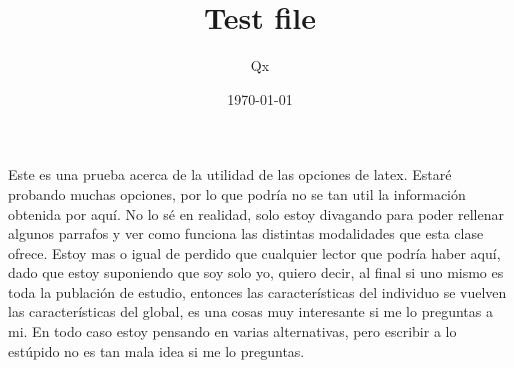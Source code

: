 \documentclass[pagesize=a5paper]{qx-files/qx-notes}
\title{Test file}
\author{Qx}
\date{\today}
\begin{document}
  \maketitle

  Este es una prueba acerca de la utilidad de las opciones de latex. Estaré probando muchas opciones,
  por lo que podría no se tan util la información obtenida por aquí. No lo sé en realidad, solo estoy
  divagando para poder rellenar algunos parrafos y ver como funciona las distintas modalidades que
  esta clase ofrece. Estoy mas o igual de perdido que cualquier lector que podría haber aquí, dado que
  estoy suponiendo que soy solo yo, quiero decir, al final si uno mismo es toda la publación de estudio,
  entonces las características del individuo se vuelven las características del global, es una cosas muy
  interesante si me lo preguntas a mi. En todo caso estoy pensando en varias alternativas, pero escribir
  a lo estúpido no es tan mala idea si me lo preguntas.

  \ttfamily
\end{document}

